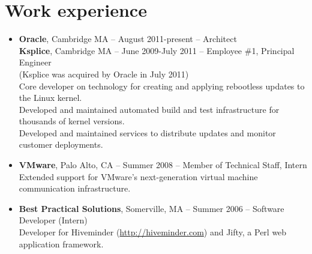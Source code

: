 \documentclass[letterpaper,10pt]{article}
\begin{document}
\section*{Work experience}
\vspace*{-0.2cm}
\begin{itemize}
\item\textbf{Oracle}, Cambridge MA -- August 2011-present -- Architect \\
  \textbf{Ksplice}, Cambridge MA -- June 2009-July 2011 -- Employee \#1, Principal Engineer \\
  {\small(Ksplice was acquired by Oracle in July 2011)} \\
  Core developer on technology for creating and applying rebootless
  updates to the Linux kernel. \\
  Developed and maintained automated build and test infrastructure for
  thousands of kernel versions. \\
  Developed and maintained services to distribute updates and
  monitor customer deployments.
  \item\textbf{VMware}, Palo Alto, CA --
    Summer 2008 -- Member of Technical Staff, Intern \\
    Extended support for VMware's next-generation virtual machine
    communication infrastructure.
  \item \textbf{Best Practical Solutions}, Somerville, MA --
    Summer 2006 -- Software Developer (Intern) \\
    Developer for Hiveminder (\url{http://hiveminder.com}) and Jifty,
    a Perl web application framework.

\end{itemize}
\end{document}
